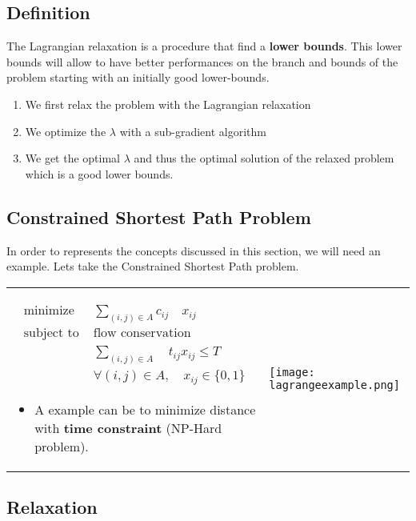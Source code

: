 \subsection{Definition}
The Lagrangian relaxation is a procedure that find a \textbf{lower
bounds}. This
lower bounds will allow to have better performances on the branch and
bounds of the problem starting with an initially good lower-bounds.

\begin{enumerate}
    \item We first relax the problem with the Lagrangian relaxation 
    \item We optimize the $\lambda$ with a sub-gradient algorithm 
    \item We get the optimal $\lambda$ and thus the optimal solution of
        the relaxed problem which is a good lower bounds.
\end{enumerate}

\subsection{Constrained Shortest Path Problem}
In order to represents the concepts discussed in this section, we will
need an example. Lets take the Constrained Shortest Path problem.

\begin{tabular}{m{8cm}m{6cm}}
    \begin{eqnarray*}
        \textrm{minimize } & \sum_{(i,j) \in A} c_{ij} \quad x_{ij} \\
        \textrm{subject to } & \textrm{flow conservation}\\
                            & \sum_{(i,j) \in A } \quad t_{ij} x_{ij} \leq T \\
                             & \forall (i, j) \in A, \quad x_{ij} \in \{0, 1\}
        \end{eqnarray*}

        \begin{itemize}
            \item A example can be to minimize distance with
                \textbf{time constraint} (NP-Hard problem).
        \end{itemize}
& \texttt{[image: lagrangeexample.png]}
\end{tabular}


\subsection{Relaxation}


